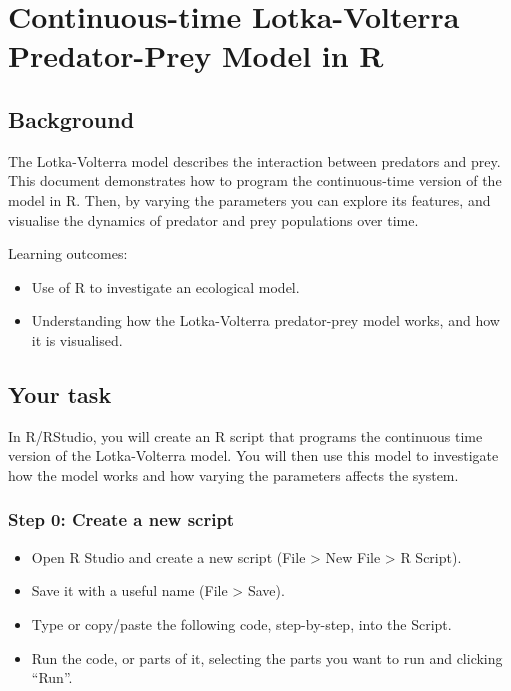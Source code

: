 \documentclass[
  a4paper]{book}
\providecommand{\tightlist}{%
  \setlength{\itemsep}{0pt}\setlength{\parskip}{0pt}}
\begin{document}
\chapter{Continuous-time Lotka-Volterra Predator-Prey Model in R}\label{continuous-time-lotka-volterra-predator-prey-model-in-r}

\section{Background}\label{background-16}

The Lotka-Volterra model describes the interaction between predators and prey. This document demonstrates how to program the continuous-time version of the model in R. Then, by varying the parameters you can explore its features, and visualise the dynamics of predator and prey populations over time.

\begin{do-something}
Learning outcomes:

\begin{itemize}
\tightlist
\item
  Use of R to investigate an ecological model.
\item
  Understanding how the Lotka-Volterra predator-prey model works, and
  how it is visualised.
\end{itemize}
\end{do-something}

\section{Your task}\label{your-task-16}

In R/RStudio, you will create an R script that programs the continuous time version of the Lotka-Volterra model. You will then use this model to investigate how the model works and how varying the parameters affects the system.

\subsection{Step 0: Create a new script}\label{step-0-create-a-new-script}

\begin{itemize}
\tightlist
\item
  Open R Studio and create a new script (File \textgreater{} New File \textgreater{} R Script).
\item
  Save it with a useful name (File \textgreater{} Save).
\item
  Type or copy/paste the following code, step-by-step, into the Script.
\item
  Run the code, or parts of it, selecting the parts you want to run and clicking ``Run''.
\end{itemize}
\end{document}
